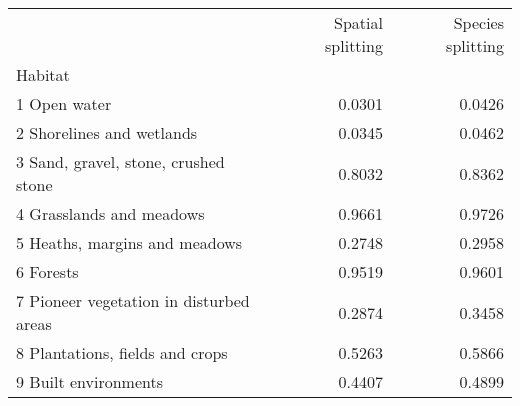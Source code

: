 \begin{tabular}{lrr}
\toprule
{} &  Spatial splitting &  Species splitting \\
Habitat                                 &                    &                    \\
\midrule
1 Open water                            &             0.0301 &             0.0426 \\
2 Shorelines and wetlands               &             0.0345 &             0.0462 \\
3 Sand, gravel, stone, crushed stone    &             0.8032 &             0.8362 \\
4 Grasslands and meadows                &             0.9661 &             0.9726 \\
5 Heaths, margins and meadows           &             0.2748 &             0.2958 \\
6 Forests                               &             0.9519 &             0.9601 \\
7 Pioneer vegetation in disturbed areas &             0.2874 &             0.3458 \\
8 Plantations, fields and crops         &             0.5263 &             0.5866 \\
9 Built environments                    &             0.4407 &             0.4899 \\
\bottomrule
\end{tabular}
